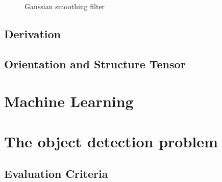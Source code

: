 \begin{figure}
		    \caption{Gaussian smoothing filter}
		    \label{fig:gauss_intro}
		\end{figure}


		\subsection{Derivation}
		\subsection{Orientation and Structure Tensor}
		
	
	\section{Machine Learning}
	\label{machine_learning}
	
	\section{The object detection problem}
	\label{the_object_detection_problem}
		\subsection{Evaluation Criteria}
